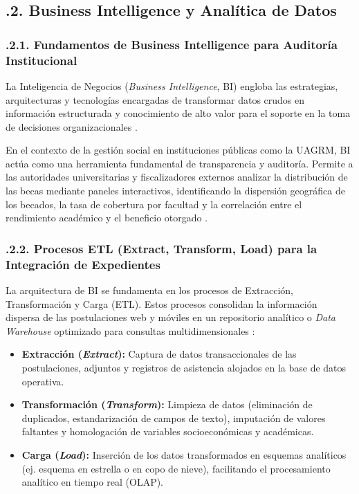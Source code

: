 \subsection{.2. Business Intelligence y Analítica de Datos}\label{sec:business_intelligence}

\subsubsection{.2.1. Fundamentos de Business Intelligence para Auditoría Institucional}\label{sec:bi_fundamentos}

La Inteligencia de Negocios (\textit{Business Intelligence}, BI) engloba las estrategias, arquitecturas y tecnologías encargadas de transformar datos crudos en información estructurada y conocimiento de alto valor para el soporte en la toma de decisiones organizacionales \parencite{power2002dss}.

En el contexto de la gestión social en instituciones públicas como la UAGRM, BI actúa como una herramienta fundamental de transparencia y auditoría. Permite a las autoridades universitarias y fiscalizadores externos analizar la distribución de las becas mediante paneles interactivos, identificando la dispersión geográfica de los becados, la tasa de cobertura por facultad y la correlación entre el rendimiento académico y el beneficio otorgado \parencite{golfarelli2009dw}.

\subsubsection{.2.2. Procesos ETL (Extract, Transform, Load) para la Integración de Expedientes}\label{sec:bi_etl}

La arquitectura de BI se fundamenta en los procesos de Extracción, Transformación y Carga (ETL). Estos procesos consolidan la información dispersa de las postulaciones web y móviles en un repositorio analítico o \textit{Data Warehouse} optimizado para consultas multidimensionales \parencite{kimball2004etl}:

\begin{itemize}
    \item \textbf{Extracción (\textit{Extract}):} Captura de datos transaccionales de las postulaciones, adjuntos y registros de asistencia alojados en la base de datos operativa.

    \item \textbf{Transformación (\textit{Transform}):} Limpieza de datos (eliminación de duplicados, estandarización de campos de texto), imputación de valores faltantes y homologación de variables socioeconómicas y académicas.

    \item \textbf{Carga (\textit{Load}):} Inserción de los datos transformados en esquemas analíticos (ej. esquema en estrella o en copo de nieve), facilitando el procesamiento analítico en tiempo real (OLAP).
\end{itemize}

